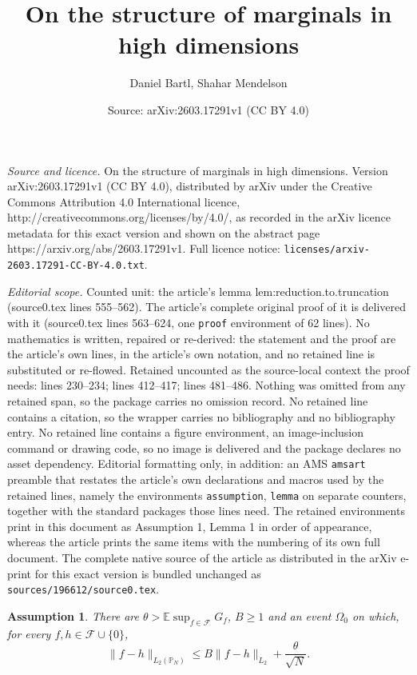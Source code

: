 \documentclass[10pt,a4paper]{amsart}
\title{On the structure of marginals in high dimensions}
\author{Daniel Bartl, Shahar Mendelson}
\date{Source: arXiv:2603.17291v1 (CC BY 4.0)}
\newtheorem{assumption}{Assumption}
\newcommand{\E}{\mathbb{E}}
\renewcommand{\P}{\mathbb{P}}
\begin{document}
\maketitle

\noindent\emph{Source and licence.} On the structure of marginals in high dimensions. Version arXiv:2603.17291v1 (CC BY 4.0), distributed by arXiv under the Creative Commons Attribution 4.0 International licence, http://creativecommons.org/licenses/by/4.0/, as recorded in the arXiv licence metadata for this exact version and shown on the abstract page https://arxiv.org/abs/2603.17291v1. Full licence notice: \texttt{licenses/arxiv-2603.17291-CC-BY-4.0.txt}.\par\smallskip

\noindent\textit{Editorial scope.} Counted unit: the article's lemma lem:reduction.to.truncation (source0.tex lines 555--562). The article's complete original proof of it is delivered with it (source0.tex lines 563--624, one \texttt{proof} environment of 62 lines). No mathematics is written, repaired or re-derived: the statement and the proof are the article's own lines, in the article's own notation, and no retained line is substituted or re-flowed.  Retained uncounted as the source-local context the proof needs: lines 230--234; lines 412--417; lines 481--486.  Nothing was omitted from any retained span, so the package carries no omission record.  No retained line contains a citation, so the wrapper carries no bibliography and no bibliography entry.  No retained line contains a figure environment, an image-inclusion command or drawing code, so no image is delivered and the package declares no asset dependency.  Editorial formatting only, in addition: an AMS \texttt{amsart} preamble that restates the article's own declarations and macros used by the retained lines, namely the environments \texttt{assumption}, \texttt{lemma} on separate counters, together with the standard packages those lines need.  The retained environments print in this document as Assumption 1, Lemma 1 in order of appearance, whereas the article prints the same items with the numbering of its own full document.  The complete native source of the article as distributed in the arXiv e-print for this exact version is bundled unchanged as \texttt{sources/196612/source0.tex}.
\begin{assumption}
\label{ass:main}
	There are  $\theta > \E \sup_{f\in\mathcal{F}} G_f $, $B\geq 1$ and an event $\Omega_{0}$ on which, for every $f,h\in\mathcal{F}\cup\{0\}$, 
	\[ \|f-h\|_{L_{2}(\P_{N})} \leq B   \|f-h\|_{L_{2}}  + \frac{\theta}{\sqrt N}.\]	
\end{assumption}
\end{document}
